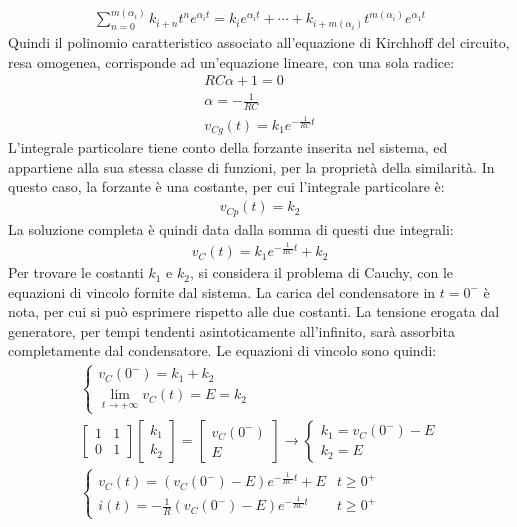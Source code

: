 \documentclass{article}
\numberwithin{equation}{subsection}
\begin{document}
\begin{gather*}
    \displaystyle\sum_{n=0}^{m(\alpha_i)}k_{i+n}t^ne^{\alpha_it}=k_ie^{\alpha_it}+\cdots+k_{i+m(\alpha_i)}t^{m(\alpha_i)}e^{\alpha_1t}
\end{gather*}
Quindi il polinomio caratteristico associato all'equazione di Kirchhoff del circuito, resa omogenea, corrisponde ad un'equazione lineare, con una sola radice:
\begin{gather*}
    RC\alpha+1=0\\
    \alpha=\displaystyle-\frac{1}{RC}\\
    v_{Cg}(t)=k_1e^{-\frac{1}{RC}t}
\end{gather*}
L'integrale particolare tiene conto della forzante inserita nel sistema, ed appartiene alla sua stessa classe di funzioni, per la proprietà della similarità. In questo caso, 
la forzante è una costante, per cui l'integrale particolare è:
\begin{gather*}
    v_{Cp}(t)=k_2
\end{gather*}
La soluzione completa è quindi data dalla somma di questi due integrali:
\begin{gather*}
    v_C(t)=k_1e^{-\frac{1}{RC}t}+k_2
\end{gather*}
Per trovare le costanti $k_1$ e $k_2$, si considera il problema di Cauchy, con le equazioni di vincolo fornite dal sistema. La carica del condensatore in $t=0^-$ è nota, 
per cui si può esprimere rispetto alle due costanti. La tensione erogata dal generatore, per tempi tendenti asintoticamente all'infinito, sarà assorbita 
completamente dal condensatore. Le equazioni di vincolo sono quindi:
\begin{gather*}
    \begin{cases}
        v_C(0^-)=k_1+k_2\\
        \displaystyle\lim_{t\to+\infty}v_C(t)=E=k_2
    \end{cases}\\
    \begin{bmatrix}
        1&1\\0&1
    \end{bmatrix}\begin{bmatrix}
        k_1\\k_2
    \end{bmatrix}=\begin{bmatrix}
        v_C(0^-)\\E
    \end{bmatrix}\to
    \begin{cases}
        k_1=v_C(0^-)-E\\
        k_2=E
    \end{cases}\\
    \begin{cases}
        v_C(t)=(v_C(0^-)-E)e^{-\frac{1}{RC}t}+E&t\geq0^+\\
        i(t)=-\displaystyle\frac{1}{R}(v_C(0^-)-E)e^{-\frac{1}{RC}t} &t\geq0^+
    \end{cases}
\end{gather*}
\end{document}
